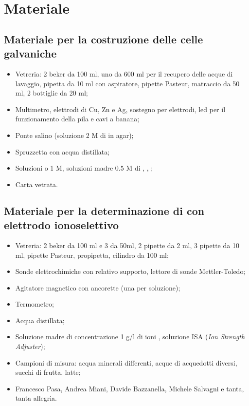 \section*{Materiale}

\subsection*{Materiale per la costruzione delle celle galvaniche}

\begin{itemize}
        \setlength{\parskip}{0pt}
        \item{Vetreria: 2 beker da 100 ml, uno da 600 ml per il recupero delle acque di lavaggio, 
            pipetta da 10 ml con aspiratore, pipette Pasteur,
            matraccio da 50 ml, 2 bottiglie da 20 ml;}
        \item{Multimetro, elettrodi di Cu, Zn e Ag,
            sostegno per elettrodi, led per il funzionamento della pila e cavi a banana;}
        \item{Ponte salino (soluzione 2 M di  in agar);}
        \item{Spruzzetta con acqua distillata;}
        \item{Soluzioni  o  1 M, soluzioni madre 0.5 M di , , ;}
        \item{Carta vetrata.}
\end{itemize}

\subsection*{Materiale per la determinazione di  con elettrodo ionoselettivo}

\begin{itemize}
        \setlength{\parskip}{0pt}
        \item{Vetreria: 2 beker da 100 ml e 3 da 50ml, 2 pipette da 2 ml, 3 pipette da 10 ml, pipette Pasteur,
            propipetta, cilindro da 100 ml;}
        \item{Sonde elettrochimiche con relativo supporto, lettore di sonde Mettler-Toledo;}
        \item{Agitatore magnetico con ancorette (una per soluzione);}
        \item{Termometro;}
        \item{Acqua distillata;}
        \item{Soluzione madre di concentrazione 1 g/l di ioni , soluzione ISA (\emph{Ion Strength
            Adjuster});}
        \item{Campioni di misura: acqua minerali differenti, acque di acquedotti diversi, succhi di frutta, latte;}
        \item{Francesco Pasa, Andrea Miani, Davide Bazzanella, Michele Salvagni e tanta, tanta allegria.}
\end{itemize}

